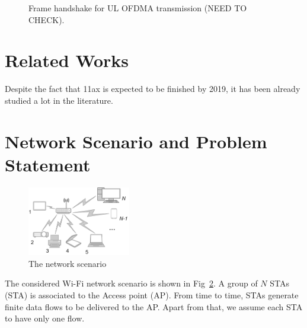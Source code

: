 \begin{figure}[t]
{}
	\caption{\label{fig:transmission} Frame handshake for UL OFDMA transmission (NEED TO CHECK).}
	\vspace{-0.5em}
\end{figure}

\section{Related Works}
\label{sec:related}
Despite the fact that 11ax is expected to be finished by 2019, it has been already studied a lot in the literature.

\section{Network Scenario and Problem Statement}
\label{sec:scenario}

\begin{figure}[t]
	\includegraphics[width = 0.4\textwidth]{NetworkScenario}
	\caption{\label{fig:scenario} The network scenario}
\end{figure}

The considered Wi-Fi network scenario is shown in Fig~\ref{fig:scenario}. A group of $N$ STAs (STA) is associated to the Access point (AP). 
From time to time, STAs generate finite data flows to be delivered to the AP. Apart from that, we assume each STA to have only one flow.

